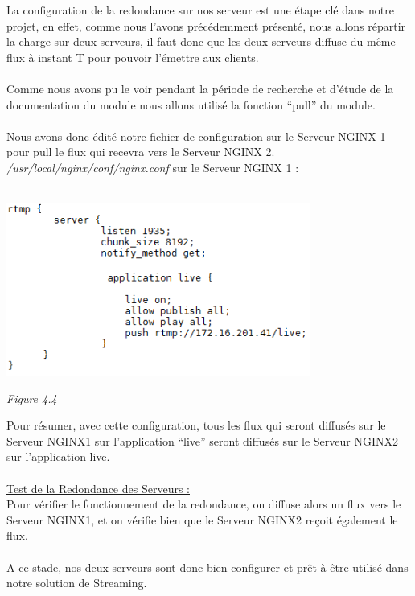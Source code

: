 \documentclass{report}
\begin{document}
    La configuration de la redondance sur nos serveur est une étape clé dans notre projet, en effet, comme nous l’avons précédemment présenté, nous allons répartir la charge sur deux serveurs, il faut donc que les deux serveurs diffuse du même flux à instant T pour pouvoir l'émettre aux clients.
    \\
    \\
    Comme nous avons pu le voir pendant la période de recherche et d’étude de la documentation du module nous allons utilisé la fonction “pull” du module.
    \\
    \\
    Nous avons donc édité notre fichier de configuration sur le Serveur NGINX 1 pour pull le flux qui recevra vers le Serveur NGINX 2.
    \textit{/usr/local/nginx/conf/nginx.conf} sur le Serveur NGINX 1 :
    \\
    \\
    
    
   \begin{center}
    \includegraphics[width=10cm]{img/conf2.PNG}
    
    \textit{\small{Figure 4.4}}
    \end{center}    
    
    
    
    
    Pour résumer, avec cette configuration, tous les flux qui seront diffusés sur le Serveur NGINX1 sur l’application “live” seront diffusés sur le Serveur NGINX2 sur l’application live.
    \\
    \\
    
    \underline{Test de la Redondance des Serveurs :}\\

    Pour vérifier le fonctionnement de la redondance, on diffuse alors un flux vers le Serveur NGINX1, et on vérifie bien que le Serveur NGINX2 reçoit également le flux.
    \\
    \\
    A ce stade, nos deux serveurs sont donc bien configurer et prêt à être utilisé dans notre solution de Streaming.
    \\
    \\
    
\end{document}
